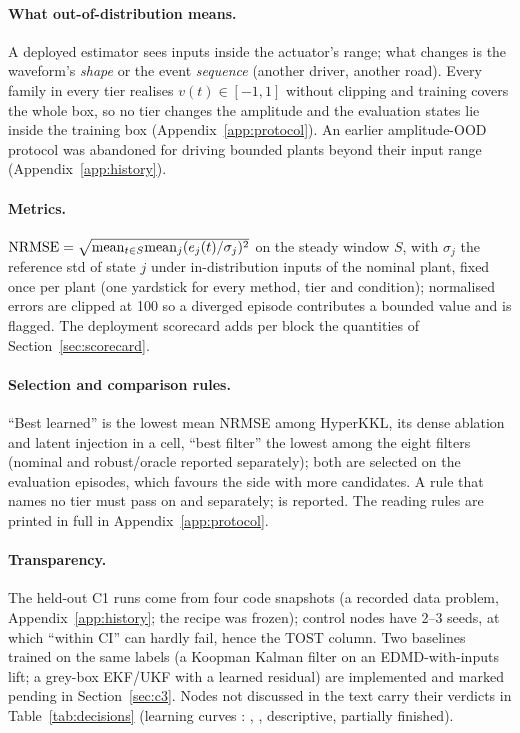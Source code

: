 \paragraph{What out-of-distribution means.} A deployed estimator sees inputs inside the actuator's range; what changes is the waveform's \emph{shape} or the event \emph{sequence} (another driver, another road). Every family in every tier realises $v(t)\in[-1,1]$ without clipping and training covers the whole box, so no tier changes the amplitude and the evaluation states lie inside the training box (Appendix~\ref{app:protocol}). An earlier amplitude-OOD protocol was abandoned for driving bounded plants beyond their input range (Appendix~\ref{app:history}).

\paragraph{Metrics.} $\mathrm{NRMSE}=\sqrt{\mathrm{mean}_{t\in S}\mathrm{mean}_j (e_j(t)/\sigma_j)^2}$ on the steady window $S$, with $\sigma_j$ the reference std of state $j$ under in-distribution inputs of the nominal plant, fixed once per plant (one yardstick for every method, tier and condition); normalised errors are clipped at 100 so a diverged episode contributes a bounded value and is flagged. The deployment scorecard adds per block the quantities of Section~\ref{sec:scorecard}.

\paragraph{Selection and comparison rules.} ``Best learned'' is the lowest mean NRMSE among HyperKKL, its dense ablation and latent injection in a cell, ``best filter'' the lowest among the eight filters (nominal and robust/oracle reported separately); both are selected on the evaluation episodes, which favours the side with more candidates. A rule that names no tier must pass on  and  separately;  is reported. The reading rules are printed in full in Appendix~\ref{app:protocol}.

\paragraph{Transparency.} The held-out C1 runs come from four code snapshots (a recorded data problem, Appendix~\ref{app:history}; the recipe was frozen); control nodes have 2--3 seeds, at which ``within CI'' can hardly fail, hence the TOST column. Two baselines trained on the same labels (a Koopman Kalman filter on an EDMD-with-inputs lift; a grey-box EKF/UKF with a learned residual) are implemented and marked pending in Section~\ref{sec:c3}. Nodes not discussed in the text carry their verdicts in Table~\ref{tab:decisions} (learning curves : \OutcomeCThreeDataFifty, \OutcomeCThreeDataOneFiveZero, descriptive, partially finished).
